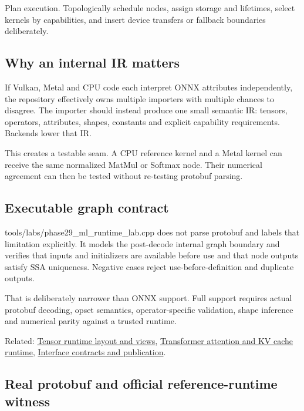 Plan execution. Topologically schedule nodes, assign storage and lifetimes, select kernels by capabilities, and insert device transfers or fallback boundaries deliberately.

\subsection{Why an internal IR matters}\label{appendix-a87217e3af2b-why-an-internal-ir-matters}

If Vulkan, Metal and CPU code each interpret ONNX attributes independently, the repository effectively owns multiple importers with multiple chances to disagree. The importer should instead produce one small semantic IR: tensors, operators, attributes, shapes, constants and explicit capability requirements. Backends lower that IR.

This creates a testable seam. A CPU reference kernel and a Metal kernel can receive the same normalized MatMul or Softmax node. Their numerical agreement can then be tested without re-testing protobuf parsing.

\subsection{Executable graph contract}\label{appendix-a87217e3af2b-executable-graph-contract}

tools/labs/phase29\_ml\_runtime\_lab.cpp does not parse protobuf and labels that limitation explicitly. It models the post-decode internal graph boundary and verifies that inputs and initializers are available before use and that node outputs satisfy SSA uniqueness. Negative cases reject use-before-definition and duplicate outputs.

That is deliberately narrower than ONNX support. Full support requires actual protobuf decoding, opset semantics, operator-specific validation, shape inference and numerical parity against a trusted runtime.

Related: \hyperref[appendix-cebadf3106d1]{Tensor runtime layout and views}, \hyperref[appendix-ea2dadd21ce5]{Transformer attention and KV cache runtime}, \hyperref[appendix-fdae7ff0a23f]{Interface contracts and publication}.

\subsection{Real protobuf and official reference-runtime witness}\label{appendix-a87217e3af2b-real-protobuf-and-official-reference-runtime-witness}

